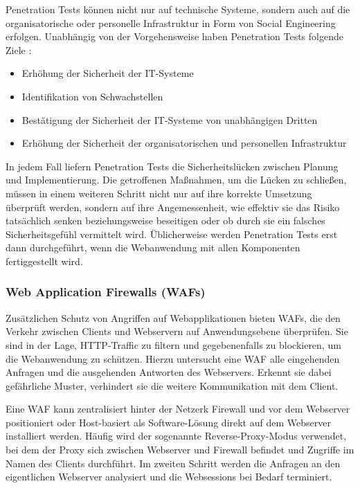 \documentclass[12pt,oneside,a4paper,parskip]{scrbook}
\begin{document}
    Penetration Tests können nicht nur auf technische Systeme, sondern auch auf die organisatorische oder
    personelle Infrastruktur in Form von Social Engineering erfolgen.
    Unabhängig von der Vorgehensweise haben Penetration Tests folgende Ziele \cite{BSI}:
    \begin{itemize}
      \item Erhöhung der Sicherheit der IT-Systeme
      \item Identifikation von Schwachstellen
      \item Bestätigung der Sicherheit der IT-Systeme von unabhängigen Dritten
      \item Erhöhung der Sicherheit der organisatorischen und personellen Infrastruktur
    \end{itemize}

    In jedem Fall liefern Penetration Tests die Sicherheitslücken zwischen Planung und Implementierung. Die
    getroffenen Maßnahmen, um die Lücken zu schließen, müssen in einem weiteren Schritt nicht nur auf ihre
    korrekte Umsetzung überprüft werden, sondern auf ihre Angemessenheit, wie effektiv sie das Risiko
    tatsächlich senken beziehungsweise beseitigen oder ob durch sie ein falsches Sicherheitsgefühl vermittelt
    wird. Üblicherweise werden Penetration Tests erst dann durchgeführt, wenn die Webanwendung mit allen
    Komponenten fertiggestellt wird. \cite{BSI}
    \subsubsection{Web Application Firewalls (WAFs)}
    Zusätzlichen Schutz von Angriffen auf Webapplikationen bieten WAFs, die den Verkehr zwischen Clients und Webservern auf Anwendungsebene überprüfen. Sie sind in der Lage, HTTP-Traffic zu filtern und gegebenenfalls zu blockieren, um die Webanwendung zu schützen.
    Hierzu untersucht eine WAF alle eingehenden Anfragen und die ausgehenden Antworten des Webservers.
    Erkennt sie dabei gefährliche Muster, verhindert sie die weitere Kommunikation mit dem Client.

    Eine WAF kann zentralisiert hinter der Netzerk Firewall und vor dem Webserver positioniert oder Host-basiert als Software-Lösung direkt auf dem Webserver installiert werden.
    Häufig wird der sogenannte Reverse-Proxy-Modus verwendet, bei dem der Proxy sich zwischen Webserver und Firewall befindet und Zugriffe im Namen des Clients durchführt. Im zweiten Schritt werden die Anfragen an den eigentlichen Webserver analysiert und die Websessions bei Bedarf terminiert.
\end{document}

